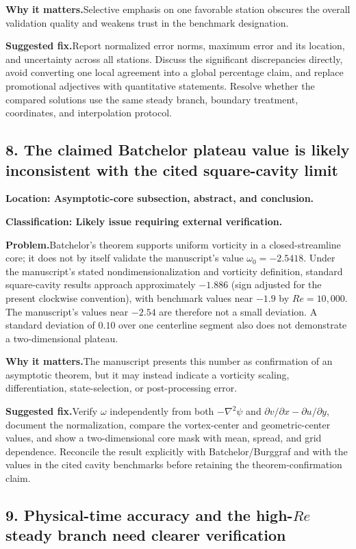 \documentclass[11pt]{article}
\newcommand{\classification}[1]{\par\noindent\textbf{Classification: #1.}\par}
\newcommand{\location}[1]{\textbf{Location: #1}}
\newcommand{\problem}{\noindent\textbf{Problem.}\hspace{0.35em}}
\newcommand{\importance}{\par\noindent\textbf{Why it matters.}\hspace{0.35em}}
\newcommand{\fix}{\par\noindent\textbf{Suggested fix.}\hspace{0.35em}}
\begin{document}
\importance Selective emphasis on one favorable station obscures the overall validation quality and weakens trust in the benchmark designation.

\fix Report normalized error norms, maximum error and its location, and uncertainty across all stations.  Discuss the significant discrepancies directly, avoid converting one local agreement into a global percentage claim, and replace promotional adjectives with quantitative statements.  Resolve whether the compared solutions use the same steady branch, boundary treatment, coordinates, and interpolation protocol.

\subsection*{8. The claimed Batchelor plateau value is likely inconsistent with the cited square-cavity limit}

\location{Asymptotic-core subsection, abstract, and conclusion.}

\classification{Likely issue requiring external verification}

\problem Batchelor's theorem supports uniform vorticity in a closed-streamline core; it does not by itself validate the manuscript's value $\omega_0=-2.5418$.  Under the manuscript's stated nondimensionalization and vorticity definition, standard square-cavity results approach approximately $-1.886$ (sign adjusted for the present clockwise convention), with benchmark values near $-1.9$ by $Re=10{,}000$.  The manuscript's values near $-2.54$ are therefore not a small deviation.  A standard deviation of $0.10$ over one centerline segment also does not demonstrate a two-dimensional plateau.

\importance The manuscript presents this number as confirmation of an asymptotic theorem, but it may instead indicate a vorticity scaling, differentiation, state-selection, or post-processing error.

\fix Verify $\omega$ independently from both $-\nabla^2\psi$ and $\partial v/\partial x-\partial u/\partial y$, document the normalization, compare the vortex-center and geometric-center values, and show a two-dimensional core mask with mean, spread, and grid dependence.  Reconcile the result explicitly with Batchelor/Burggraf and with the values in the cited cavity benchmarks before retaining the theorem-confirmation claim.

\subsection*{9. Physical-time accuracy and the high-$Re$ steady branch need clearer verification}
\end{document}
